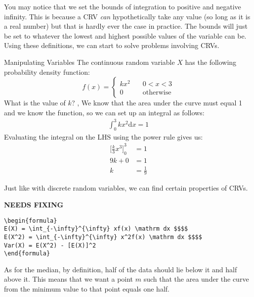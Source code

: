You may notice that we set the bounds of integration to positive and negative infinity. This is because a CRV \textit{can} hypothetically take any value (so long as it is a real number) but that is hardly ever the case in practice. The bounds will just be set to whatever the lowest and highest possible values of the variable can be. Using these definitions, we can start to solve problems involving CRVs.
\begin{example}{Manipulating Variables}
The continuous random variable $X$ has the following probability density function:
$$f(x) = 
        \begin{cases}
            kx^2 & \quad 0 < x < 3 \\
            0 & \quad \text{otherwise}
        \end{cases}
$$
What is the value of $k$? 
\sep
We know that the area under the curve must equal 1 and we know the function, so we can set up an integral as follows:
\begin{align}
    \int_0^3 kx^2 \mathrm dx = 1
\end{align}
Evaluating the integral on the LHS using the power rule gives us:
\begin{align}
    {\Big[\frac{k}3 x^3\Big]}_0^3 &= 1 \\
    9k + 0 &= 1 \\
    k &= \frac{1}9
\end{align}
\end{example}

Just like with discrete random variables, we can find certain properties of CRVs.

{\hfill\Large\bfseries NEEDS FIXING\hfill}
\begin{lstlisting}
\begin{formula}
E(X) = \int_{-\infty}^{\infty} xf(x) \mathrm dx $$$$
E(X^2) = \int_{-\infty}^{\infty} x^2f(x) \mathrm dx $$$$
Var(X) = E(X^2) - [E(X)]^2
\end{formula}
 \end{lstlisting}

As for the median, by definition, half of the data should lie below it and half above it. This means that we want a point $m$ such that the area under the curve from the minimum value to that point equals one half.

